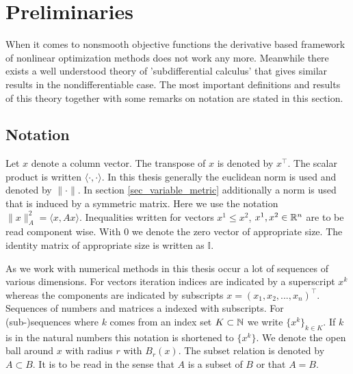 \section{Preliminaries}
\label{sec_prelim}

When it comes to nonsmooth objective functions the  derivative based framework of nonlinear optimization methods does not work any more. Meanwhile there exists a well understood theory of 'subdifferential calculus' that gives similar results in the nondifferentiable case.
The most important definitions and results of this theory together with some remarks on notation are stated in this section.


\subsection{Notation}

Let \(x\) denote a column vector. The transpose of \(x\) is denoted by \(x^{\top}\). The scalar product is written \(\langle \cdot, \cdot \rangle\).
In this thesis generally the euclidean norm is used and denoted by \(\|\cdot\|\). In section \ref{sec_variable_metric} additionally a norm is used that is induced by a symmetric matrix. Here we use the notation \(\|x\|^2_A = {\langle x, Ax \rangle}\).
Inequalities written for vectors \(x^1 \leq x^2\), \(x^1, x^2 \in \mathbb{R}^n\) are to be read component wise.
With \(0\) we denote the zero vector of appropriate size.  The identity matrix of appropriate size is written as \(\mathbb{I}\).

As we work with numerical methods in this thesis occur a lot of sequences of various dimensions. For vectors iteration indices are indicated by a superscript \(x^k\) whereas the components are  indicated by subscripts \(x = \left(x_1,x_2,...,x_n\right)^{\top}\). Sequences of numbers and matrices a indexed with subscripts.
For (sub-)sequences where \(k\) comes from an index set \(K \subset \mathbb{N}\) we write \(\{x^k\}_{k \in K}\). If \(k\) is in the natural numbers this notation is shortened to \(\{x^k\}\).
We denote the open ball around \(x\) with radius \(r\) with \(B_{r}(x)\).
The subset relation is denoted by \(A\subset B\). It is to be read in the sense that \(A\) is a subset of \(B\) or that \(A=B\). 



